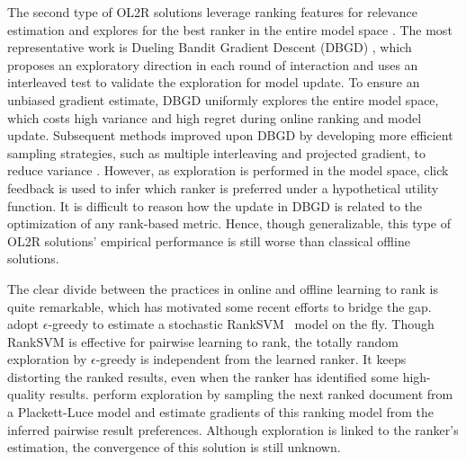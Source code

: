 The second type of OL2R solutions leverage ranking features for relevance estimation and explores for the best ranker in the entire model space \cite{yue2009interactively,li2018online,oosterhuis2018differentiable}. The most representative work is Dueling Bandit Gradient Descent (DBGD) \cite{yue2009interactively,schuth2014multileaved}, which proposes an exploratory direction in each round of interaction and uses an interleaved test \cite{chapelle2012large} to validate the exploration for model update. To ensure an unbiased gradient estimate, DBGD uniformly explores the entire model space, which 
costs high variance and high regret during online ranking and model update. 
Subsequent methods improved upon DBGD by developing more efficient sampling strategies, such as multiple interleaving and projected gradient, to reduce variance \cite{hofmann2012estimating,zhao2016constructing,oosterhuis2017balancing, wang2018efficient, wang2019variance}. However, as exploration is performed in the model space, click feedback is used to infer which ranker is preferred under a hypothetical utility function. It is difficult to reason how the update in DBGD is related to the optimization of any rank-based metric. Hence, though generalizable, this type of OL2R solutions' empirical performance is still worse than classical offline solutions.



The clear divide between the practices in online and offline learning to rank is quite remarkable, which has motivated some recent efforts to bridge the gap. \citet{hofmann2013balancing} adopt $\epsilon$-greedy to estimate a stochastic RankSVM~\cite{joachims2002optimizing, herbrich1999support} model on the fly. Though RankSVM is effective for pairwise learning to rank, the totally random exploration by $\epsilon$-greedy is independent from the learned ranker. It keeps distorting the ranked results, even when the ranker has identified some high-quality results. \citet{oosterhuis2018differentiable} perform exploration by sampling the next ranked document from a Plackett-Luce model and estimate gradients of this ranking model from the inferred pairwise result preferences. Although exploration is linked to the ranker's estimation, the convergence of this solution is still unknown. 

